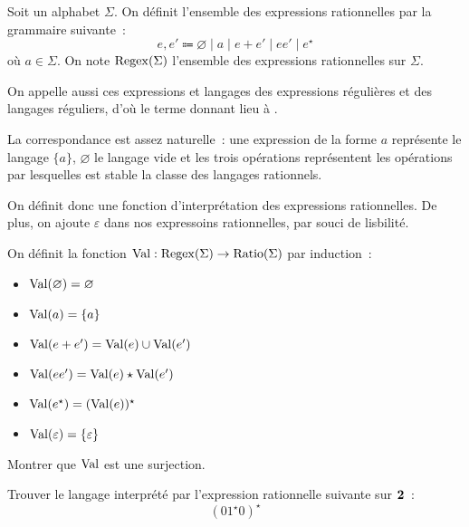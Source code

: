 \begin{definition}
  Soit un alphabet $\Sigma$. On définit l'ensemble des expressions rationnelles
  par la grammaire suivante~:
  \[e,e' \Coloneq \varnothing\mid a \mid e + e' \mid e e' \mid e^\star\]
  où $a \in \Sigma$. On note $\operatorname{Regex}(\Sigma)$ l'ensemble des expressions
  rationnelles sur $\Sigma$.
\end{definition}

\begin{remark}
  On appelle aussi ces expressions et langages des expressions régulières et des
  langages réguliers, d'où le terme  donnant
  lieu à .
\end{remark}

La correspondance est assez naturelle~: une expression de la forme $a$
représente le langage $\{a\}$, $\varnothing$ le langage vide et les trois
opérations représentent les opérations par lesquelles est stable la classe des
langages rationnels.

On définit donc une fonction d'interprétation des expressions rationnelles. De
plus, on ajoute $\varepsilon$ dans nos expressoins rationnelles, par souci de
lisbilité.

\begin{definition}
  On définit la fonction $\operatorname{Val} : \operatorname{Regex}(\Sigma)\to\operatorname{Ratio}(\Sigma)$ par
  induction~:
  \begin{itemize}
  \item $\operatorname{Val}(\varnothing) = \varnothing$
  \item $\operatorname{Val}(a) = \{a\}$
  \item $\operatorname{Val}(e+e') = \operatorname{Val}(e) \cup \operatorname{Val}(e')$
  \item $\operatorname{Val}(ee') = \operatorname{Val}(e) \star \operatorname{Val}(e')$
  \item $\operatorname{Val}(e^\star) = (\operatorname{Val}(e))^\star$
  \item $\operatorname{Val}(\varepsilon) = \{\varepsilon\}$
  \end{itemize}
\end{definition}

\begin{exercise}
  Montrer que $\operatorname{Val}$ est une surjection.
\end{exercise}

\begin{exercise}
  Trouver le langage interprété par l'expression rationnelle suivante sur
  $\boldsymbol{2}$~:
  \[(01^\star 0)^\star\]
\end{exercise}

